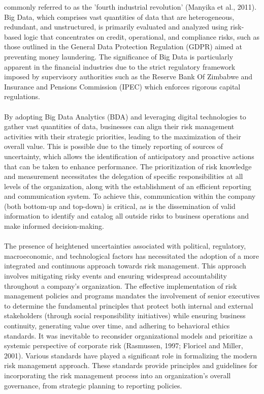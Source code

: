 commonly referred to as the 'fourth industrial revolution' (Manyika et al., 2011). Big Data, which
comprises vast quantities of data that are heterogeneous, redundant, and unstructured, is
primarily evaluated and analyzed using risk-based logic that concentrates on credit, operational,
and compliance risks, such as those outlined in the General Data Protection Regulation
(GDPR) aimed at preventing money laundering. The significance of Big Data is
particularly apparent in the financial industries due to the strict
regulatory framework imposed by supervisory authorities such as the Reserve Bank Of
Zimbabwe and Insurance and Pensions Commission (IPEC) which enforces rigorous capital
regulations.\\\\
By adopting Big Data Analytics (BDA) and leveraging digital technologies to gather vast
quantities of data, businesses can align their risk management activities with their strategic
priorities, leading to the maximization of their overall value. This is possible due to the timely
reporting of sources of uncertainty, which allows the identification of anticipatory and proactive
actions that can be taken to enhance performance. The prioritization of risk knowledge and
measurement necessitates the delegation of specific responsibilities at all levels of the
organization, along with the establishment of an efficient reporting and communication system.
To achieve this, communication within the company (both bottom-up and top-down) is critical, as
is the dissemination of valid information to identify and catalog all outside risks to business
operations and make informed decision-making.\\\\
The presence of heightened uncertainties associated with political, regulatory, macroeconomic,
and technological factors has necessitated the adoption of a more integrated and continuous
approach towards risk management. This approach involves mitigating risky events and
ensuring widespread accountability throughout a company's organization. The effective
implementation of risk management policies and programs mandates the involvement of senior
executives to determine the fundamental principles that protect both internal and external
stakeholders (through social responsibility initiatives) while ensuring business continuity,
generating value over time, and adhering to behavioral ethics standards. It was inevitable to
reconsider organizational models and prioritize a systemic perspective of corporate risk
(Rasmussen, 1997; Floricel and Miller, 2001). Various standards have played a significant role
in formalizing the modern risk management approach. These standards provide principles and guidelines for incorporating the
risk management process into an organization's overall governance, from strategic planning to
reporting policies.


